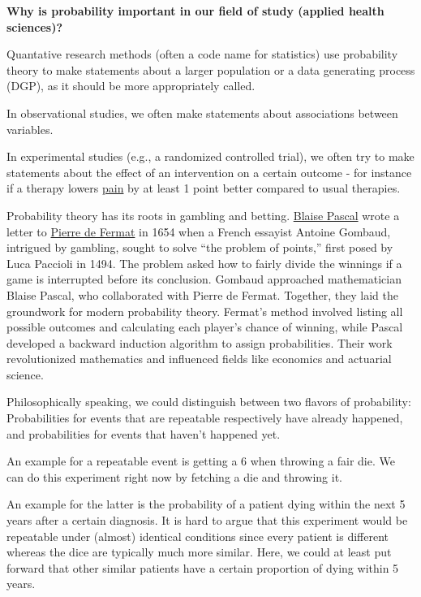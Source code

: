 \documentclass[
]{book}
\begin{document}
\textbf{Why is probability important in our field of study (applied health sciences)?}

Quantative research methods (often a code name for statistics) use probability theory to make statements about a larger
population or a data generating process (DGP), as it should be more appropriately called.

In observational studies, we often make statements about associations between variables.

In experimental studies (e.g., a randomized controlled trial), we often try to make statements about the effect of an intervention on a
certain outcome - for instance if a therapy lowers \href{https://jamanetwork.com/journals/jama/fullarticle/2794765}{pain} by at least 1 point better compared to usual therapies.

Probability theory has its roots in gambling and betting. \href{https://en.wikipedia.org/wiki/Blaise_Pascal}{Blaise Pascal} wrote a letter to \href{https://en.wikipedia.org/wiki/Pierre_de_Fermat}{Pierre de Fermat} in 1654 when a
French essayist Antoine Gombaud, intrigued by gambling, sought to solve ``the problem of points,''
first posed by Luca Paccioli in 1494. The problem asked how to fairly divide the winnings if a game is interrupted before
its conclusion. Gombaud approached mathematician Blaise Pascal, who collaborated with Pierre de Fermat. Together, they laid
the groundwork for modern probability theory. Fermat's method involved listing all possible outcomes and calculating each player's
chance of winning, while Pascal developed a backward induction algorithm to assign probabilities. Their work revolutionized mathematics
and influenced fields like economics and actuarial science.

Philosophically speaking, we could distinguish between two flavors of probability: Probabilities for events that are repeatable respectively have already happened, and probabilities for events that haven't happened yet.

An example for a repeatable event is getting a 6 when throwing a fair die. We can do this experiment right now by fetching a die and throwing it.

An example for the latter is the probability of a patient dying within the next 5 years after a certain diagnosis.
It is hard to argue that this experiment would be repeatable under (almost) identical conditions since every patient is different whereas the dice are typically much more similar.
Here, we could at least put forward that other similar patients have a certain proportion of dying within 5 years.
\end{document}
